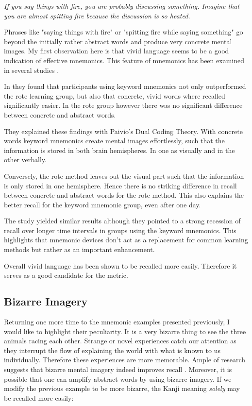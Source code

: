 \emph{If you say things with fire, you are probably discussing something. Imagine that you are almost spitting fire because the discussion is so heated.}

Phrases like "saying things with fire" or "spitting fire while saying something" go beyond the initially rather abstract words and produce very concrete mental images. My first observation here is that vivid language seems to be a good indication of effective mnemonics. This feature of mnemonics has been examined in  several studies \cite{campos_2004} \cite{campos_2011} \cite{kordjazi2014effect}.

In \cite{campos_2011} they found that participants using keyword mnemonics not only outperformed the rote learning group, but also that concrete, vivid words where recalled significantly easier. In the rote group however there was no significant difference between concrete and abstract words.

They explained these findings with Paivio's Dual Coding Theory. With concrete words keyword mnemonics create mental images effortlessly, such that the information is stored in both brain hemispheres. In one as visually and in the other verbally.

Conversely, the rote method leaves out the visual part such that the information is only stored in one hemisphere. Hence there is no striking difference in recall between concrete and abstract words for the rote method. This also explains the better recall for the keyword mnemonic group, even after one day.

The study \cite{campos_2004} yielded similar results although they pointed to a strong recession of recall over longer time intervals in groups using the keyword mnemonics. This highlights that mnemonic devices don't act as a replacement for common learning methods but rather as an important enhancement.

Overall vivid language has been shown to be recalled more easily. Therefore it serves as a good candidate for the metric.
\subsection{Bizarre Imagery}
Returning one more time to the mnemonic examples presented previously, I would like to highlight their peculiarity. It is a very bizarre thing to see the three animals racing each other. Strange or novel experiences catch our attention as they interrupt the flow of explaining the world with what is known to us individually. Therefore these experiences are more memorable. Ample of research suggests that bizarre mental imagery indeed improves recall \cite{bizzare_obrian} \cite{mahdi2018effect}. Moreover, it is possible that one can amplify abstract words by using bizarre imagery. If we modify the previous example to be more bizarre, the Kanji meaning \emph{solely} may be recalled more easily:

